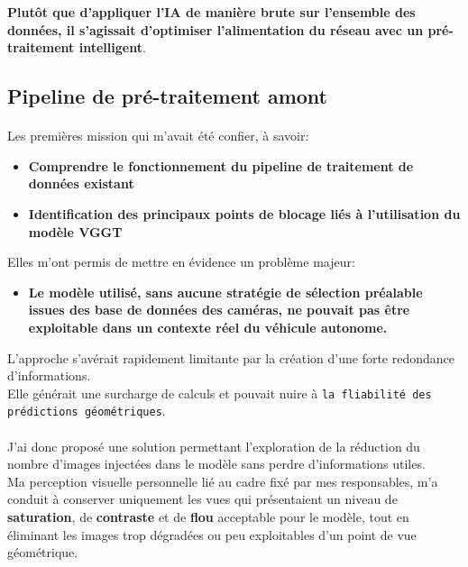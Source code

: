 \documentclass[12pt,a4paper,oneside]{report}
\begin{document}
\textbf{Plutôt que d'appliquer l'IA de manière brute sur l'ensemble des données, il s'agissait d'optimiser l'alimentation du réseau avec un pré-traitement intelligent}.
\subsection{Pipeline de pré-traitement amont}
\paragraph{}
\hspace*{0.5cm} Les premières mission qui m'avait été confier, à savoir:
\begin{itemize}[label=\textbullet]
    \item \textbf{Comprendre le fonctionnement du pipeline de traitement de données existant}
    \item \textbf{Identification des principaux points de blocage liés à l'utilisation du modèle VGGT}
\end{itemize}

Elles m'ont permis de mettre en évidence un problème majeur:
\begin{itemize}[label=\textbullet]
    \item \textbf{Le modèle utilisé, sans aucune stratégie de sélection préalable issues des base de données des caméras, ne pouvait pas être exploitable dans un contexte réel du véhicule autonome.}
\end{itemize}

\bigskip

\hspace*{.5cm}L'approche s'avérait rapidement limitante par la création d'une forte redondance d'informations.\\
Elle générait une surcharge de calculs et pouvait nuire à \texttt{la fliabilité des prédictions géométriques}.

\paragraph{} 
J'ai donc proposé une solution permettant l'exploration de la réduction du nombre d'images injectées dans le modèle sans perdre d'informations utiles.\\
\hspace*{.5cm} Ma perception visuelle personnelle lié au cadre fixé par mes responsables, m'a conduit à conserver uniquement les vues qui présentaient un niveau de \textbf{saturation}, de \textbf{contraste} et de \textbf{flou} acceptable pour le modèle, tout en éliminant les images trop dégradées ou peu exploitables d'un point de vue géométrique.\\
\end{document}
